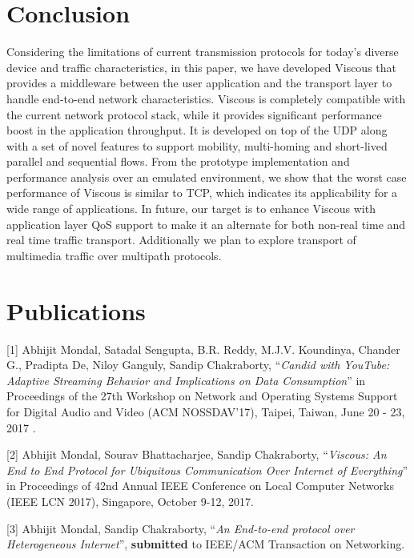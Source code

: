 \section{Conclusion}
Considering the limitations of current transmission protocols for today’s diverse device and traffic characteristics, in this paper, we have developed Viscous that provides a middleware between the user application and the transport layer to handle end-to-end network characteristics. Viscous is completely compatible with the current network protocol stack, while it provides significant performance boost in the application throughput. It is developed on top of the UDP along with a set of novel features to support mobility, multi-homing and short-lived parallel and sequential flows. From the prototype implementation and performance analysis over an emulated environment, we show that the worst case performance of Viscous is similar to TCP, which indicates its applicability for a wide range of applications. 
In future, our target is to enhance Viscous with application layer QoS support to make it an alternate for both non-real time and real time traffic transport.  Additionally we plan to explore transport of multimedia traffic over multipath protocols. 


\section*{Publications}
[1] Abhijit Mondal, Satadal Sengupta, B.R. Reddy, M.J.V. Koundinya, Chander G., Pradipta De, Niloy Ganguly, Sandip Chakraborty, ``\textit{Candid with YouTube: Adaptive Streaming Behavior and Implications on Data Consumption}'' in Proceedings of the 27th Workshop on Network and Operating Systems Support for Digital Audio and Video (ACM NOSSDAV'17), Taipei, Taiwan, June 20 - 23, 2017 .

[2] Abhijit Mondal, Sourav Bhattacharjee, Sandip Chakraborty, ``\textit{Viscous: An End to End Protocol for Ubiquitous Communication Over Internet of Everything}'' in Proceedings of 42nd Annual IEEE Conference on Local Computer Networks (IEEE LCN 2017), Singapore, October 9-12, 2017.

[3] Abhijit Mondal, Sandip Chakraborty, ``\textit{An End-to-end protocol over Heterogeneous Internet}'', \textbf{submitted} to IEEE/ACM Transaction on Networking.
